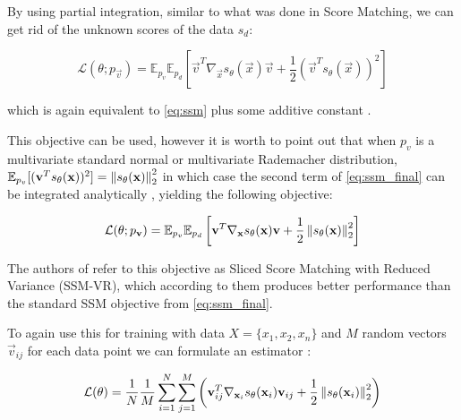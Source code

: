 By using partial integration, similar to what was done in Score Matching, we can get rid of the unknown scores of the data $s_d$:

\begin{equation}
    \label{eq:ssm_final}
    \mathcal{L}(\theta; p_\vec{v}) = \mathbb{E}_{p_v} \mathbb{E}_{p_d} \left[ \vec{v}^T \nabla_\vec{x} s_\theta(\vec{x}) \vec{v} + \frac{1}{2} \left( \vec{v}^T s_\theta(\vec{x}) \right)^2 \right]
\end{equation}

which is again equivalent to \ref{eq:ssm} plus some additive constant \cite{ssm}. 

This objective can be used, however
it is worth to point out that when $p_v$ is a multivariate standard normal or multivariate Rademacher distribution, 
$\mathbb{E}_{p_v} [ ( \textbf{v}^T s_\theta(\textbf{x}) )^2 ] = \left\lVert s_\theta(\textbf{x})\right\rVert_2^2$ in which case the second term 
of \ref{eq:ssm_final} can be integrated analytically \cite{ssm}, yielding the following objective:

\begin{equation}
    \mathcal{L}(\theta; p_{\textbf{v}}) = \mathbb{E}_{p_v} \mathbb{E}_{p_d} \left[ \textbf{v}^T \nabla_{\textbf{x}} s_\theta(\textbf{x}) \textbf{v} + \frac{1}{2} \left\lVert s_\theta(\textbf{x}) \right\rVert^2_2 \right]
\end{equation}

The authors of \cite{ssm} refer to this objective as 
Sliced Score Matching with Reduced Variance (SSM-VR), which according to them produces better performance than the standard SSM objective from \ref{eq:ssm_final}.

To again use this for training with data $X = \{x_1, x_2, x_n\}$ and $M$ random vectors $\vec v_{ij}$ for each data point we can formulate an estimator \cite{ssm}:

\begin{equation}
    \label{eq:ssm_vr}
    \mathcal{L}(\theta) = \frac{1}{N} \frac{1}{M} \sum_{i=1}^{N} \sum_{j=1}^{M} \left( \textbf{v}_{ij}^T \nabla_{\textbf{x}_i} s_{\theta}(\textbf{x}_i) \textbf{v}_{ij} + \frac{1}{2} \left\lVert s_{\theta}(\textbf{x}_i) \right\rVert^2_2 \right)
\end{equation}